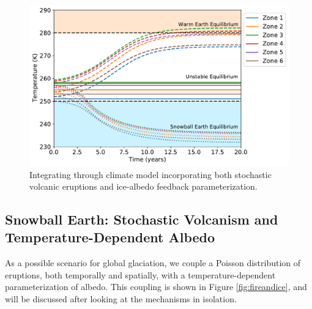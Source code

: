 \documentclass[12pt]{article}
\begin{document}


\begin{figure}[H]
    \centering
    \includegraphics[scale=0.6]{albedo_equilibria_1plot.pdf}
    \caption{
        Integrating through climate model incorporating both stochastic volcanic
        eruptions and ice-albedo feedback parameterization.
    }
    \label{fig:albedo_equil}
\end{figure}
\FloatBarrier

\subsection{Snowball Earth: Stochastic Volcanism and Temperature-Dependent
Albedo} 
As a possible scenario for global glaciation, we couple a Poisson
distribution of eruptions, both temporally and spatially, with a
temperature-dependent parameterization of albedo. This coupling is shown in
Figure \ref{fig:fireandice}, and will be discussed after looking at the
mechanisms in isolation. \\
\end{document}
